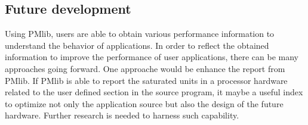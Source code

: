 \documentclass[conference]{IEEEtran}
\begin{document}
%
%
%

\subsection{Future development}
\label{subsection:future-development}
Using PMlib, users are able to obtain various performance information
to understand the behavior of applications.
In order to reflect the obtained information to improve the performance
of user applications, there can be many approaches going forward.
One approache would be enhance the report from PMlib.
If PMlib is able to report the saturated units in a processor hardware
related to the user defined section in the source program,
it maybe a useful index to optimize not only the application source
but also the design of the future hardware.
Further research is needed to harness such capability.
\end{document}
